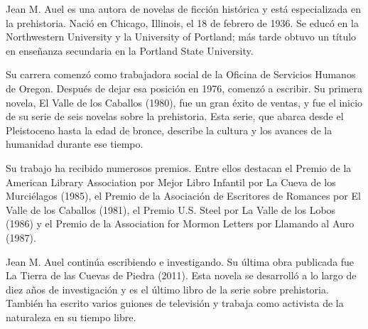
Jean M. Auel es una autora de novelas de ficción histórica y está especializada en la prehistoria. Nació en Chicago, Illinois, el 18 de febrero de 1936. Se educó en la Northwestern University y la University of Portland; más tarde obtuvo un título en enseñanza secundaria en la Portland State University.

Su carrera comenzó como trabajadora social de la Oficina de Servicios Humanos de Oregon. Después de dejar esa posición en 1976, comenzó a escribir. Su primera novela, El Valle de los Caballos (1980), fue un gran éxito de ventas, y fue el inicio de su serie de seis novelas sobre la prehistoria. Esta serie, que abarca desde el Pleistoceno hasta la edad de bronce, describe la cultura y los avances de la humanidad durante ese tiempo.

Su trabajo ha recibido numerosos premios. Entre ellos destacan el Premio de la American Library Association por Mejor Libro Infantil por La Cueva de los Murciélagos (1985), el Premio de la Asociación de Escritores de Romances por El Valle de los Caballos (1981), el Premio U.S. Steel por La Valle de los Lobos (1986) y el Premio de la Association for Mormon Letters por Llamando al Auro (1987).

Jean M. Auel continúa escribiendo e investigando. Su última obra publicada fue La Tierra de las Cuevas de Piedra (2011). Esta novela se desarrolló a lo largo de diez años de investigación y es el último libro de la serie sobre prehistoria. También ha escrito varios guiones de televisión y trabaja como activista de la naturaleza en su tiempo libre.